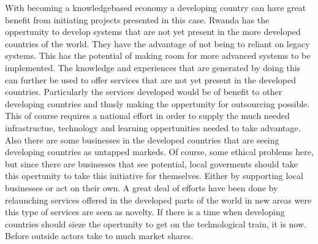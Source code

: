 With becoming a knowledgebased economy a developing country can have great benefit from initiating projects presented in this case.
Rwanda has the oppertunity to develop systems that are not yet present in the more developed countries of the world.
They have the advantage of not being to reliant on legacy systems. 
This has the potential of making room for more advanced systems to be implemented. 
The knowledge and experiences that are generated by doing this can further be used to offer services that are not yet present in the developed countries. 
Particularly the services developed would be of benefit to other developing countries and thusly making the oppertunity for outsourcing possible. 
This of course requires a national effort in order to supply the much needed infrastructue, technology and learning oppertunities needed to take advantage. 
Also there are some businesses in the developed countries that are seeing developing countries as untapped markeds.
Of course, some ethical problems here, but since there are businesses that see potential, local goverments should take this opertunity to take this initiative for themselves. Either by supporting local businesses or act on their own. 
A great deal of efforts have been done by relaunching services offered in the developed parts of the world in new areas were this type of services are seen as novelty.
If there is a time when developing countries should sieze the opertunity to get on the technological train, it is now. 
Before outside actors take to much market shares. 



\cite{overview:rdb}
\cite{rw:snl}

